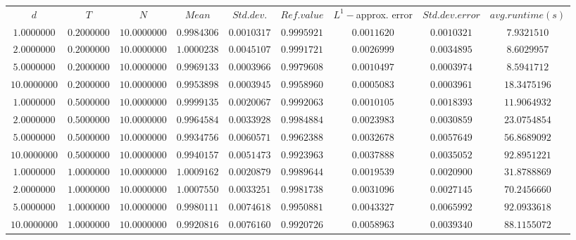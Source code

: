 \begin{tabular}{ccccccccc}
$d$ & $T$ & $N$ & $Mean$ & $Std. dev.$ & $Ref. value$ & $L^1-$approx. error & $Std. dev. error$ & $avg. runtime (s)$\\
$1.0000000$ & $0.2000000$ & $10.0000000$ & $0.9984306$ & $0.0010317$ & $0.9995921$ & $0.0011620$ & $0.0010321$ & $7.9321510$\\
$2.0000000$ & $0.2000000$ & $10.0000000$ & $1.0000238$ & $0.0045107$ & $0.9991721$ & $0.0026999$ & $0.0034895$ & $8.6029957$\\
$5.0000000$ & $0.2000000$ & $10.0000000$ & $0.9969133$ & $0.0003966$ & $0.9979608$ & $0.0010497$ & $0.0003974$ & $8.5941712$\\
$10.0000000$ & $0.2000000$ & $10.0000000$ & $0.9953898$ & $0.0003945$ & $0.9958960$ & $0.0005083$ & $0.0003961$ & $18.3475196$\\
$1.0000000$ & $0.5000000$ & $10.0000000$ & $0.9999135$ & $0.0020067$ & $0.9992063$ & $0.0010105$ & $0.0018393$ & $11.9064932$\\
$2.0000000$ & $0.5000000$ & $10.0000000$ & $0.9964584$ & $0.0033928$ & $0.9984884$ & $0.0023983$ & $0.0030859$ & $23.0754854$\\
$5.0000000$ & $0.5000000$ & $10.0000000$ & $0.9934756$ & $0.0060571$ & $0.9962388$ & $0.0032678$ & $0.0057649$ & $56.8689092$\\
$10.0000000$ & $0.5000000$ & $10.0000000$ & $0.9940157$ & $0.0051473$ & $0.9923963$ & $0.0037888$ & $0.0035052$ & $92.8951221$\\
$1.0000000$ & $1.0000000$ & $10.0000000$ & $1.0009162$ & $0.0020879$ & $0.9989644$ & $0.0019539$ & $0.0020900$ & $31.8788869$\\
$2.0000000$ & $1.0000000$ & $10.0000000$ & $1.0007550$ & $0.0033251$ & $0.9981738$ & $0.0031096$ & $0.0027145$ & $70.2456660$\\
$5.0000000$ & $1.0000000$ & $10.0000000$ & $0.9980111$ & $0.0074618$ & $0.9950881$ & $0.0043327$ & $0.0065992$ & $92.0933618$\\
$10.0000000$ & $1.0000000$ & $10.0000000$ & $0.9920816$ & $0.0076160$ & $0.9920726$ & $0.0058963$ & $0.0039340$ & $88.1155072$\\
\end{tabular}
